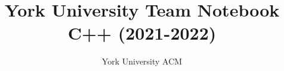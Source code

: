 \documentclass[11pt]{article}
\title{\vspace{-4ex}\Large{York University Team Notebook C++ (2021-2022)}}
\author{York University ACM}
\begin{document}
\begin{landscape}
\begin{multicols*}{2}

\maketitle
\vspace{-13ex}
\tableofcontents
\pagestyle{fancy}



\end{multicols*}
\end{landscape}
\end{document}
